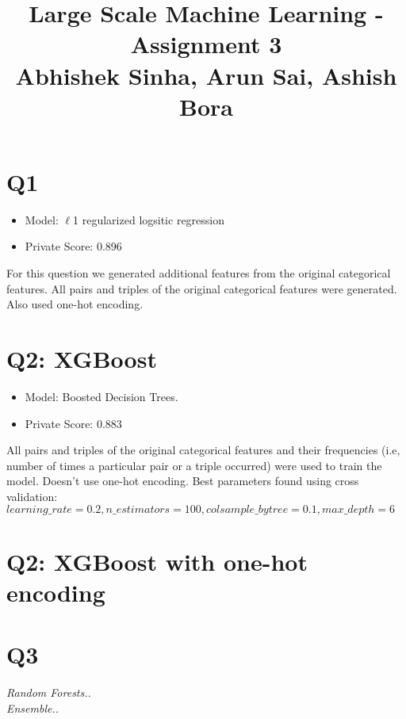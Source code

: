 \documentclass{article}
\begin{document}
\title{Large Scale Machine Learning - Assignment 3\\Abhishek Sinha, Arun Sai, Ashish Bora}
\maketitle
\section{Q1}
\begin{itemize}
\item Model:  $\ell$1 regularized logsitic regression
\item Private Score: 0.896
\end{itemize}

For this question we generated additional features from the original categorical features. All pairs and triples of the original categorical features were generated. Also used one-hot encoding.
\section{Q2: XGBoost}
\begin{itemize}
\item Model:  Boosted Decision Trees. 
\item Private Score: 0.883
\end{itemize}

All pairs and triples of the original categorical features and their frequencies (i.e, number of times a particular pair or a triple occurred) were used to train the model. Doesn't use one-hot encoding. Best parameters found using cross validation: $learning\_rate =0.2, n\_estimators=100, colsample\_bytree = 0.1, max\_depth=6$


\section{Q2: XGBoost with one-hot encoding}
\section{Q3}
\textit{Random Forests..}\\
\textit{Ensemble..}
\end{document}
